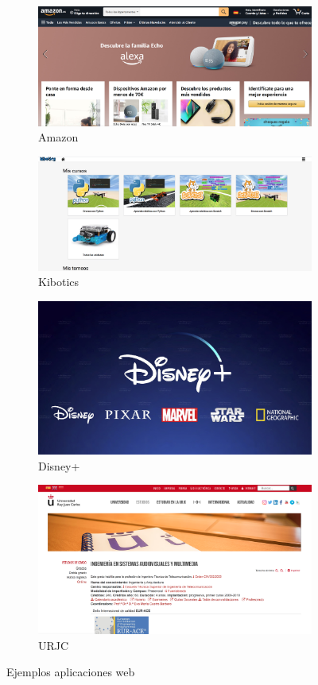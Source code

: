 \begin{figure}[h]
\begin{subfigure}{.5\textwidth}
  \centering
  \includegraphics[width=.6\linewidth]{chapters/images/amazon.png}  
  \caption{Amazon}
  \label{fig:sub-first}
\end{subfigure}
\begin{subfigure}{.5\textwidth}
  \centering
  \includegraphics[width=.6\linewidth]{chapters/images/kibotics.png}  
  \caption{Kibotics}
  \label{fig:sub-second}
\end{subfigure}
\begin{subfigure}{.5\textwidth}
  \centering
  \includegraphics[width=.6\linewidth]{chapters/images/disney.jpeg}  
  \caption{Disney+}
  \label{fig:sub-third}
\end{subfigure}
\begin{subfigure}{.5\textwidth}
  \centering
  \includegraphics[width=.6\linewidth]{chapters/images/urjcweb.png}  
  \caption{URJC}
  \label{fig:sub-fourth}
\end{subfigure}
\caption{Ejemplos aplicaciones web}
\label{fig:partes robot}
\end{figure}

